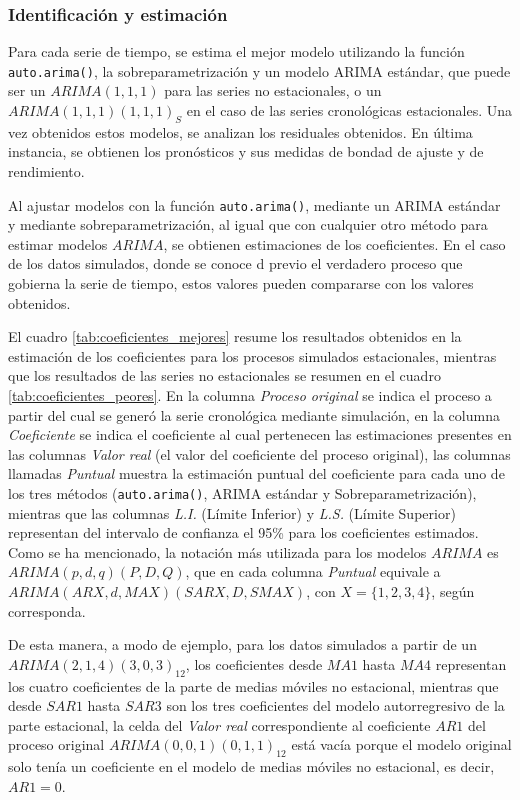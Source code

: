 \documentclass[
]{article}
\begin{document}
\subsubsection{Identificación y estimación}

Para cada serie de tiempo, se estima el mejor modelo utilizando la
función \texttt{auto.arima()}, la sobreparametrización y un modelo ARIMA
estándar, que puede ser un \(ARIMA(1,1,1)\) para las series no
estacionales, o un \(ARIMA(1,1,1)(1,1,1)_S\) en el caso de las series
cronológicas estacionales. Una vez obtenidos estos modelos, se analizan
los residuales obtenidos. En última instancia, se obtienen los
pronósticos y sus medidas de bondad de ajuste y de rendimiento.

Al ajustar modelos con la función \texttt{auto.arima()}, mediante un
ARIMA estándar y mediante sobreparametrización, al igual que con
cualquier otro método para estimar modelos \(ARIMA\), se obtienen
estimaciones de los coeficientes. En el caso de los datos simulados,
donde se conoce d previo el verdadero proceso que gobierna la serie de
tiempo, estos valores pueden compararse con los valores obtenidos.

El cuadro \ref{tab:coeficientes_mejores} resume los resultados obtenidos
en la estimación de los coeficientes para los procesos simulados
estacionales, mientras que los resultados de las series no estacionales
se resumen en el cuadro \ref{tab:coeficientes_peores}. En la columna
\emph{Proceso original} se indica el proceso a partir del cual se generó
la serie cronológica mediante simulación, en la columna
\emph{Coeficiente} se indica el coeficiente al cual pertenecen las
estimaciones presentes en las columnas \emph{Valor real} (el valor del
coeficiente del proceso original), las columnas llamadas \emph{Puntual}
muestra la estimación puntual del coeficiente para cada uno de los tres
métodos (\texttt{auto.arima()}, ARIMA estándar y Sobreparametrización),
mientras que las columnas \emph{L.I.} (Límite Inferior) y \emph{L.S.}
(Límite Superior) representan del intervalo de confianza el 95\% para
los coeficientes estimados. Como se ha mencionado, la notación más
utilizada para los modelos \(ARIMA\) es \(ARIMA(p,d,q)(P,D,Q)\), que en
cada columna \emph{Puntual} equivale a
\(ARIMA(ARX, d, MAX)(SARX, D, SMAX)\), con \(X=\{1,2,3,4\}\), según
corresponda.

De esta manera, a modo de ejemplo, para los datos simulados a partir de
un \(ARIMA(2,1,4)(3,0,3)_{12}\), los coeficientes desde \(MA1\) hasta
\(MA4\) representan los cuatro coeficientes de la parte de medias
móviles no estacional, mientras que desde \(SAR1\) hasta \(SAR3\) son
los tres coeficientes del modelo autorregresivo de la parte estacional,
la celda del \emph{Valor real} correspondiente al coeficiente \(AR1\)
del proceso original \(ARIMA(0,0,1)(0,1,1)_{12}\) está vacía porque el
modelo original solo tenía un coeficiente en el modelo de medias móviles
no estacional, es decir, \(AR1=0\).
\end{document}
